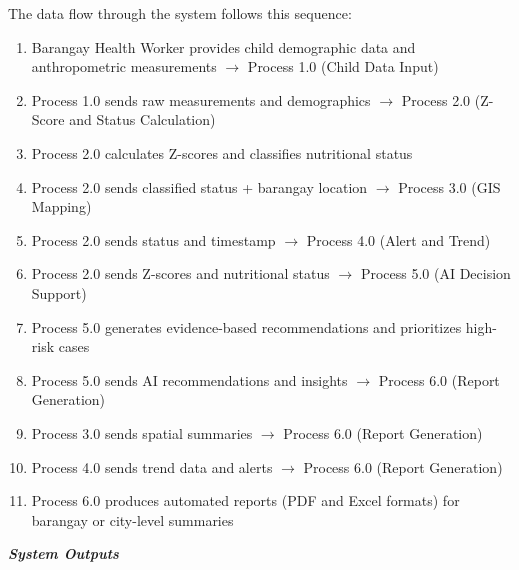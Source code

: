 \documentclass[12pt, a4paper]{report}
\begin{document}
The data flow through the system follows this sequence:
\begin{enumerate}
    \item Barangay Health Worker provides child demographic data and anthropometric measurements \(\rightarrow\) Process 1.0 (Child Data Input)
    \item Process 1.0 sends raw measurements and demographics \(\rightarrow\) Process 2.0 (Z-Score and Status Calculation)
    \item Process 2.0 calculates Z-scores and classifies nutritional status
    \item Process 2.0 sends classified status + barangay location \(\rightarrow\) Process 3.0 (GIS Mapping)
    \item Process 2.0 sends status and timestamp \(\rightarrow\) Process 4.0 (Alert and Trend)
    \item Process 2.0 sends Z-scores and nutritional status \(\rightarrow\) Process 5.0 (AI Decision Support)
    \item Process 5.0 generates evidence-based recommendations and prioritizes high-risk cases
    \item Process 5.0 sends AI recommendations and insights \(\rightarrow\) Process 6.0 (Report Generation)
    \item Process 3.0 sends spatial summaries \(\rightarrow\) Process 6.0 (Report Generation)
    \item Process 4.0 sends trend data and alerts \(\rightarrow\) Process 6.0 (Report Generation)
    \item Process 6.0 produces automated reports (PDF and Excel formats) for barangay or city-level summaries
\end{enumerate}

\noindent \textbf{\textit{System Outputs}}
\end{document}
